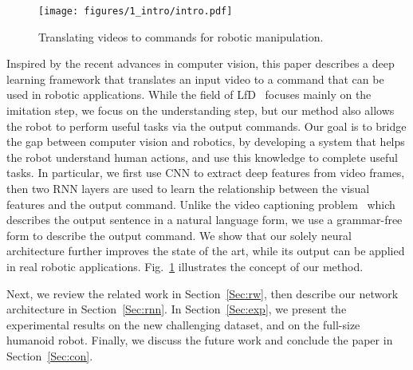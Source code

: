 \begin{figure}[!t] 
    \centering
 
     \texttt{[image: figures/1\_intro/intro.pdf]}   		
    \vspace{1ex}
    \caption{Translating videos to commands for robotic manipulation. }
    \label{Fig:intro} 
\end{figure}

Inspired by the recent advances in computer vision, this paper describes a deep learning framework that translates an input video to a command that can be used in robotic applications. While the field of LfD~\cite{Brenna2009} focuses mainly on the imitation step, we focus on the understanding step, but our method also allows the robot to perform useful tasks via the output commands. Our goal is to bridge the gap between computer vision and robotics, by developing a system that helps the robot understand human actions, and use this knowledge to complete useful tasks. In particular, we first use CNN to extract deep features from video frames, then two RNN layers are used to learn the relationship between the visual features and the output command. Unlike the video captioning problem~\cite{Venugopalan2016} which describes the output sentence in a natural language form, we use a grammar-free form to describe the output command. We show that our solely neural architecture further improves the state of the art, while its output can be applied in real robotic applications. Fig.~\ref{Fig:intro} illustrates the concept of our method.


Next, we review the related work in Section~\ref{Sec:rw}, then describe our network architecture in Section~\ref{Sec:rnn}. In Section~\ref{Sec:exp}, we present the experimental results on the new challenging dataset, and on the full-size humanoid robot. Finally, we discuss the future work and conclude the paper in Section~\ref{Sec:con}.



